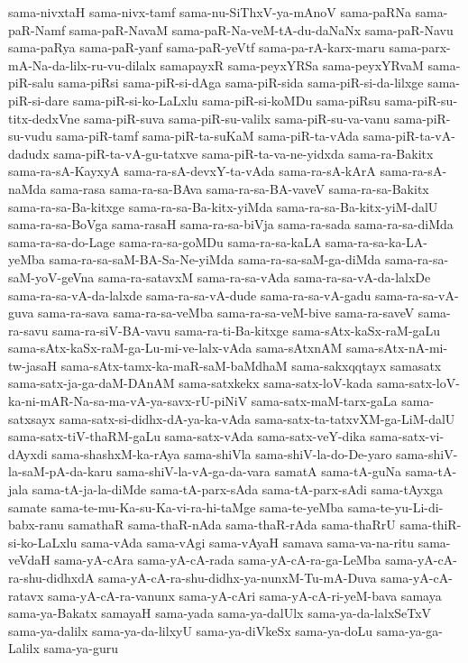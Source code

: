 {sama-nivxtaH
sama-nivx-tamf
sama-nu-SiThxV-ya-mAnoV
sama-paRNa
sama-paR-Namf
sama-paR-NavaM
sama-paR-Na-veM-tA-du-daNaNx
sama-paR-Navu
sama-paRya
sama-paR-yanf
sama-paR-yeVtf
sama-pa-rA-karx-maru
sama-parx-mA-Na-da-lilx-ru-vu-dilalx
samapayxR
sama-peyxYRSa
sama-peyxYRvaM
sama-piR-salu
sama-piRsi
sama-piR-si-dAga
sama-piR-sida
sama-piR-si-da-lilxge
sama-piR-si-dare
sama-piR-si-ko-LaLxlu
sama-piR-si-koMDu
sama-piRsu
sama-piR-su-titx-dedxVne
sama-piR-suva
sama-piR-su-valilx
sama-piR-su-va-vanu
sama-piR-su-vudu
sama-piR-tamf
sama-piR-ta-suKaM
sama-piR-ta-vAda
sama-piR-ta-vA-dadudx
sama-piR-ta-vA-gu-tatxve
sama-piR-ta-va-ne-yidxda
sama-ra-Bakitx
sama-ra-sA-KayxyA
sama-ra-sA-devxY-ta-vAda
sama-ra-sA-kArA
sama-ra-sA-naMda
sama-rasa
sama-ra-sa-BAva
sama-ra-sa-BA-vaveV
sama-ra-sa-Bakitx
sama-ra-sa-Ba-kitxge
sama-ra-sa-Ba-kitx-yiMda
sama-ra-sa-Ba-kitx-yiM-dalU
sama-ra-sa-BoVga
sama-rasaH
sama-ra-sa-biVja
sama-ra-sada
sama-ra-sa-diMda
sama-ra-sa-do-Lage
sama-ra-sa-goMDu
sama-ra-sa-kaLA
sama-ra-sa-ka-LA-yeMba
sama-ra-sa-saM-BA-Sa-Ne-yiMda
sama-ra-sa-saM-ga-diMda
sama-ra-sa-saM-yoV-geVna
sama-ra-satavxM
sama-ra-sa-vAda
sama-ra-sa-vA-da-lalxDe
sama-ra-sa-vA-da-lalxde
sama-ra-sa-vA-dude
sama-ra-sa-vA-gadu
sama-ra-sa-vA-guva
sama-ra-sava
sama-ra-sa-veMba
sama-ra-sa-veM-bive
sama-ra-saveV
sama-ra-savu
sama-ra-siV-BA-vavu
sama-ra-ti-Ba-kitxge
sama-sAtx-kaSx-raM-gaLu
sama-sAtx-kaSx-raM-ga-Lu-mi-ve-lalx-vAda
sama-sAtxnAM
sama-sAtx-nA-mi-tw-jasaH
sama-sAtx-tamx-ka-maR-saM-baMdhaM
sama-sakxqqtayx
samasatx
sama-satx-ja-ga-daM-DAnAM
sama-satxkekx
sama-satx-loV-kada
sama-satx-loV-ka-ni-mAR-Na-sa-ma-vA-ya-savx-rU-piNiV
sama-satx-maM-tarx-gaLa
sama-satxsayx
sama-satx-si-didhx-dA-ya-ka-vAda
sama-satx-ta-tatxvXM-ga-LiM-dalU
sama-satx-tiV-thaRM-gaLu
sama-satx-vAda
sama-satx-veY-dika
sama-satx-vi-dAyxdi
sama-shashxM-ka-rAya
sama-shiVla
sama-shiV-la-do-De-yaro
sama-shiV-la-saM-pA-da-karu
sama-shiV-la-vA-ga-da-vara
samatA
sama-tA-guNa
sama-tA-jala
sama-tA-ja-la-diMde
sama-tA-parx-sAda
sama-tA-parx-sAdi
sama-tAyxga
samate
sama-te-mu-Ka-su-Ka-vi-ra-hi-taMge
sama-te-yeMba
sama-te-yu-Li-di-babx-ranu
samathaR
sama-thaR-nAda
sama-thaR-rAda
sama-thaRrU
sama-thiR-si-ko-LaLxlu
sama-vAda
sama-vAgi
sama-vAyaH
samava
sama-va-na-ritu
sama-veVdaH
sama-yA-cAra
sama-yA-cA-rada
sama-yA-cA-ra-ga-LeMba
sama-yA-cA-ra-shu-didhxdA
sama-yA-cA-ra-shu-didhx-ya-nunxM-Tu-mA-Duva
sama-yA-cA-ratavx
sama-yA-cA-ra-vanunx
sama-yA-cAri
sama-yA-cA-ri-yeM-bava
samaya
sama-ya-Bakatx
samayaH
sama-yada
sama-ya-dalUlx
sama-ya-da-lalxSeTxV
sama-ya-dalilx
sama-ya-da-lilxyU
sama-ya-diVkeSx
sama-ya-doLu
sama-ya-ga-Lalilx
sama-ya-guru
}
